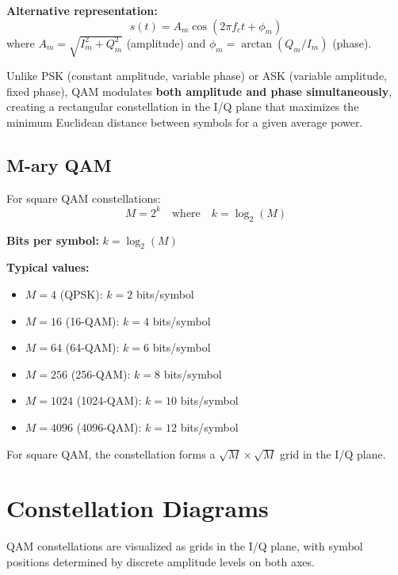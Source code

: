 \textbf{Alternative representation:}
\begin{equation}
s(t) = A_m \cos(2\pi f_c t + \phi_m)
\end{equation}
where $A_m = \sqrt{I_m^2 + Q_m^2}$ (amplitude) and $\phi_m = \arctan(Q_m/I_m)$ (phase).

\begin{keyconcept}
Unlike PSK (constant amplitude, variable phase) or ASK (variable amplitude, fixed phase), QAM modulates \textbf{both amplitude and phase simultaneously}, creating a rectangular constellation in the I/Q plane that maximizes the minimum Euclidean distance between symbols for a given average power.
\end{keyconcept}

\subsection{M-ary QAM}

For square QAM constellations:
\begin{equation}
M = 2^k \quad\text{where}\quad k = \log_2(M)
\end{equation}

\textbf{Bits per symbol:} $k = \log_2(M)$

\textbf{Typical values:}
\begin{itemize}
\item $M = 4$ (QPSK): $k = 2$ bits/symbol
\item $M = 16$ (16-QAM): $k = 4$ bits/symbol
\item $M = 64$ (64-QAM): $k = 6$ bits/symbol
\item $M = 256$ (256-QAM): $k = 8$ bits/symbol
\item $M = 1024$ (1024-QAM): $k = 10$ bits/symbol
\item $M = 4096$ (4096-QAM): $k = 12$ bits/symbol
\end{itemize}

For square QAM, the constellation forms a $\sqrt{M} \times \sqrt{M}$ grid in the I/Q plane.

\section{Constellation Diagrams}

QAM constellations are visualized as grids in the I/Q plane, with symbol positions determined by discrete amplitude levels on both axes.

